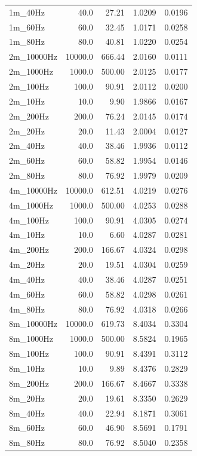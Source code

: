\documentclass[a4paper,11pt]{article}
\begin{document}
\begin{table}[h]
\begin{tabular}{lrrrr}
		1m\_40Hz     & 40.0    & 27.21  & 1.0209  & 0.0196 \\
		1m\_60Hz     & 60.0    & 32.45  & 1.0171  & 0.0258 \\
		1m\_80Hz     & 80.0    & 40.81  & 1.0220  & 0.0254 \\
		2m\_10000Hz  & 10000.0 & 666.44 & 2.0160  & 0.0111 \\
		2m\_1000Hz   & 1000.0  & 500.00 & 2.0125  & 0.0177 \\
		2m\_100Hz    & 100.0   & 90.91  & 2.0112  & 0.0200 \\
		2m\_10Hz     & 10.0    & 9.90   & 1.9866  & 0.0167 \\
		2m\_200Hz    & 200.0   & 76.24  & 2.0145  & 0.0174 \\
		2m\_20Hz     & 20.0    & 11.43  & 2.0004  & 0.0127 \\
		2m\_40Hz     & 40.0    & 38.46  & 1.9936  & 0.0112 \\
		2m\_60Hz     & 60.0    & 58.82  & 1.9954  & 0.0146 \\
		2m\_80Hz     & 80.0    & 76.92  & 1.9979  & 0.0209 \\
		4m\_10000Hz  & 10000.0 & 612.51 & 4.0219  & 0.0276 \\
		4m\_1000Hz   & 1000.0  & 500.00 & 4.0253  & 0.0288 \\
		4m\_100Hz    & 100.0   & 90.91  & 4.0305  & 0.0274 \\
		4m\_10Hz     & 10.0    & 6.60   & 4.0287  & 0.0281 \\
		4m\_200Hz    & 200.0   & 166.67 & 4.0324  & 0.0298 \\
		4m\_20Hz     & 20.0    & 19.51  & 4.0304  & 0.0259 \\
		4m\_40Hz     & 40.0    & 38.46  & 4.0287  & 0.0251 \\
		4m\_60Hz     & 60.0    & 58.82  & 4.0298  & 0.0261 \\
		4m\_80Hz     & 80.0    & 76.92  & 4.0318  & 0.0266 \\
		8m\_10000Hz  & 10000.0 & 619.73 & 8.4034  & 0.3304 \\
		8m\_1000Hz   & 1000.0  & 500.00 & 8.5824  & 0.1965 \\
		8m\_100Hz    & 100.0   & 90.91  & 8.4391  & 0.3112 \\
		8m\_10Hz     & 10.0    & 9.89   & 8.4376  & 0.2829 \\
		8m\_200Hz    & 200.0   & 166.67 & 8.4667  & 0.3338 \\
		8m\_20Hz     & 20.0    & 19.61  & 8.3350  & 0.2629 \\
		8m\_40Hz     & 40.0    & 22.94  & 8.1871  & 0.3061 \\
		8m\_60Hz     & 60.0    & 46.90  & 8.5691  & 0.1791 \\
		8m\_80Hz     & 80.0    & 76.92  & 8.5040  & 0.2358 \\
		\bottomrule
	\end{tabular}
\end{table}
\end{document}
